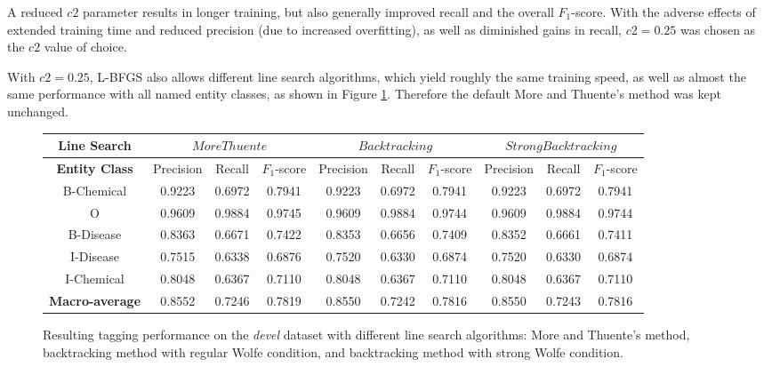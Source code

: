 \documentclass[10pt, oneside]{article}
\begin{document}
A reduced $c2$ parameter results in longer training, but also generally improved recall and the overall $F_1$-score. With the adverse effects of extended training time and reduced precision (due to increased overfitting), as well as diminished gains in recall, $c2=0.25$ was chosen as the $c2$ value of choice.

With $c2=0.25$, L-BFGS also allows different line search algorithms, which yield roughly the same training speed, as well as almost the same performance with all named entity classes, as shown in Figure \ref{fig:linesearch}. Therefore the default More and Thuente's method was kept unchanged.

\begin{figure}[h]
\begin{center}
\fontsize{9}{11}\selectfont
\begin{tabular}{|*{10}{c|}}\hline
\textbf{Line Search}  & \multicolumn{3}{c|}{$MoreThuente$} & \multicolumn{3}{c|}{$Backtracking$} & \multicolumn{3}{c|}{$StrongBacktracking$}  \\ \hline 
\textbf{Entity Class} & Precision & Recall & $F_1$-score & Precision & Recall & $F_1$-score & Precision & Recall & $F_1$-score \\ \hline
B-Chemical & 0.9223 & 0.6972 & 0.7941 & 0.9223 & 0.6972 & 0.7941 & 0.9223 & 0.6972 & 0.7941 \\ \hline
O                 & 0.9609 & 0.9884 & 0.9745 & 0.9609 & 0.9884 & 0.9744 & 0.9609 & 0.9884 & 0.9744 \\ \hline
B-Disease   & 0.8363 & 0.6671 & 0.7422 & 0.8353 & 0.6656 & 0.7409 & 0.8352 & 0.6661 & 0.7411 \\ \hline
I-Disease    & 0.7515 & 0.6338 & 0.6876 & 0.7520 & 0.6330 & 0.6874 & 0.7520 & 0.6330 & 0.6874 \\ \hline
I-Chemical  & 0.8048 & 0.6367 & 0.7110 & 0.8048 & 0.6367 & 0.7110 & 0.8048 & 0.6367 & 0.7110 \\ \hline
\textbf{Macro-average} & 0.8552 & 0.7246 & 0.7819 & 0.8550 & 0.7242 & 0.7816 & 0.8550 & 0.7243 & 0.7816 \\ \hline
\end{tabular}
\caption{\label{fig:linesearch} Resulting tagging performance on the \emph{devel} dataset with different line search algorithms: More and Thuente's method, backtracking method with regular Wolfe condition, and backtracking method with strong Wolfe condition.}
\end{center}
\end{figure}
\end{document}
